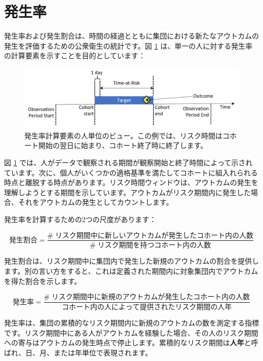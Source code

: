 \documentclass[
  11pt]{book}
\theoremstyle{definition}
\theoremstyle{definition}
\theoremstyle{definition}
\theoremstyle{definition}
\theoremstyle{remark}
\begin{document}
\section{発生率}\label{ux767aux751fux7387}

発生率および発生割合は、時間の経過とともに集団における新たなアウトカムの発生を評価するための公衆衛生の統計です。図 \ref{fig:incidenceTimeline} は、単一の人に対する発生率の計算要素を示すことを目的としています： 

\begin{figure}

{\centering \includegraphics[width=1\linewidth]{images/Characterization/incidenceTimeline} 

}

\caption{発生率計算要素の人単位のビュー。この例では、リスク時間はコホート開始の翌日に始まり、コホート終了時に終了します。}\label{fig:incidenceTimeline}
\end{figure}

図 \ref{fig:incidenceTimeline} では、人がデータで観察される期間が観察開始と終了時間によって示されています。次に、個人がいくつかの適格基準を満たしてコホートに組入れられる時点と離脱する時点があります。リスク時間ウィンドウは、アウトカムの発生を理解しようとする期間を示しています。アウトカムがリスク期間内に発生した場合、それをアウトカムの発生としてカウントします。

発生率を計算するための2つの尺度があります：

\[
発生割合 = \frac{\#\;リスク期間中に新しいアウトカムが発生したコホート内の人数}{\#\;リスク期間を持つコホート内の人数}
\]

発生割合は、リスク期間中に集団内で発生した新規のアウトカムの割合を提供します。別の言い方をすると、これは定義された期間内に対象集団内でアウトカムを得た割合を示します。

\[
発生率 = \frac{\#\;リスク期間中に新規のアウトカムが発生したコホート内の人数}{コホート内の人によって提供されたリスク期間の人年}
\]

発生率は、集団の累積的なリスク期間内に新規のアウトカムの数を測定する指標です。リスク期間中にある人がアウトカムを経験した場合、その人のリスク期間への寄与はアウトカムの発生時点で停止します。累積的なリスク期間は\textbf{人年}と呼ばれ、日、月、または年単位で表現されます。 
\end{document}
